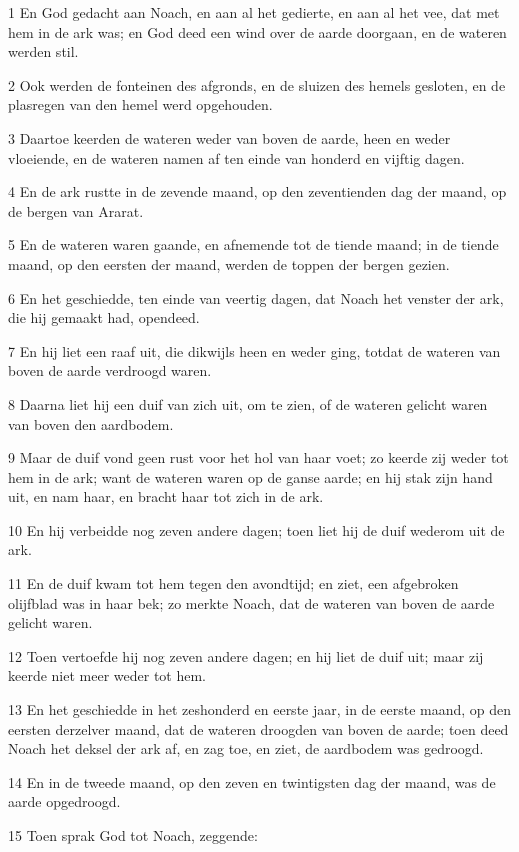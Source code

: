 \par 1 En God gedacht aan Noach, en aan al het gedierte, en aan al het vee, dat met hem in de ark was; en God deed een wind over de aarde doorgaan, en de wateren werden stil.
\par 2 Ook werden de fonteinen des afgronds, en de sluizen des hemels gesloten, en de plasregen van den hemel werd opgehouden.
\par 3 Daartoe keerden de wateren weder van boven de aarde, heen en weder vloeiende, en de wateren namen af ten einde van honderd en vijftig dagen.
\par 4 En de ark rustte in de zevende maand, op den zeventienden dag der maand, op de bergen van Ararat.
\par 5 En de wateren waren gaande, en afnemende tot de tiende maand; in de tiende maand, op den eersten der maand, werden de toppen der bergen gezien.
\par 6 En het geschiedde, ten einde van veertig dagen, dat Noach het venster der ark, die hij gemaakt had, opendeed.
\par 7 En hij liet een raaf uit, die dikwijls heen en weder ging, totdat de wateren van boven de aarde verdroogd waren.
\par 8 Daarna liet hij een duif van zich uit, om te zien, of de wateren gelicht waren van boven den aardbodem.
\par 9 Maar de duif vond geen rust voor het hol van haar voet; zo keerde zij weder tot hem in de ark; want de wateren waren op de ganse aarde; en hij stak zijn hand uit, en nam haar, en bracht haar tot zich in de ark.
\par 10 En hij verbeidde nog zeven andere dagen; toen liet hij de duif wederom uit de ark.
\par 11 En de duif kwam tot hem tegen den avondtijd; en ziet, een afgebroken olijfblad was in haar bek; zo merkte Noach, dat de wateren van boven de aarde gelicht waren.
\par 12 Toen vertoefde hij nog zeven andere dagen; en hij liet de duif uit; maar zij keerde niet meer weder tot hem.
\par 13 En het geschiedde in het zeshonderd en eerste jaar, in de eerste maand, op den eersten derzelver maand, dat de wateren droogden van boven de aarde; toen deed Noach het deksel der ark af, en zag toe, en ziet, de aardbodem was gedroogd.
\par 14 En in de tweede maand, op den zeven en twintigsten dag der maand, was de aarde opgedroogd.
\par 15 Toen sprak God tot Noach, zeggende:
